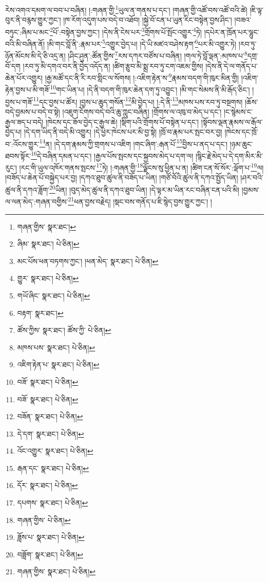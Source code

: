 རེས་འགའ་དམག་ལ་བབ་པ་བཞིན། །:གཞན་གྱི་\footnote{གཞན་གྱིས་  སྣར་ཐང་། }ཡུལ་ན་གནས་པ་དང་། །གཞན་གྱི་འཚོ་བས་འཚོ་བའི་ཚེ། །ཇི་ལྟ་བུར་ནི་བརྙས་གྱུར་ཀྱང་། །ཁ་རོག་འདུག་པས་བདེ་བ་འཐོབ། །སྐྱེ་བོ་ངན་པ་ཡུན་རིང་བསྟེན་བྱས་ཤིང་། །བཟའ་བཏུང་:ཞིམ་པ་མང་\footnote{ཞིམ་  སྣར་ཐང་།  པེ་ཅིན། }པོ་:བསྟེན་བྱས་ཀྱང་། །དེས་ནི་ངེས་པར་\footnote{མང་པོས་ཕན་བཏགས་ཀྱང་། །ཕན་མེད་  སྣར་ཐང་།  པེ་ཅིན། }གྲོགས་པོ་སྤོང་འགྱུར་\footnote{གྱུར་  སྣར་ཐང་།  པེ་ཅིན། }ཏེ། །དཔེར་ན་ཁྲོན་པར་ལྷུང་བའི་མི་བཞིན་ནོ། །མི་གང་བློ་ནི་:རྣམ་པར་\footnote{གཡོ་ཞིང་  སྣར་ཐང་།  པེ་ཅིན། }འགྱུར་བྱེད་པ། །དེ་ཡི་མཛའ་བཤེས་རྟག་\footnote{བརྟག་  སྣར་ཐང་། }པར་མི་འགྱུར་ཏེ། །རབ་ཏུ་ཉོན་མོངས་མི་དེ་ཅི་འདྲ་ན། །ཤིང་ཤུན་:ཚོན་གྱིས་\footnote{ཚོས་ཀྱིས་  སྣར་ཐང་། ཚོས་ཀྱི་  པེ་ཅིན། }རས་དཀར་བཙོས་པ་བཞིན། །གལ་ཏེ་བློ་ལྡན་:མཁས་པ་\footnote{མཁས་པས་  སྣར་ཐང་།  པེ་ཅིན། }དགྲ་བོ་དག །རབ་ཏུ་མི་དགའ་བར་ནི་བྱེད་འདོད་ན། །ཚིག་རྩུབ་མི་སྨྲ་རབ་ཏུ་ངག་འཇམ་གྱིས། །དེས་ནི་དེ་ལ་གནོད་པ་ཆེན་པོར་འགྱུར། །རྒྱ་མཚོ་དང་ནི་རི་རབ་གླིང་ལ་སོགས། །:འཇིག་རྟེན་ས་\footnote{འཇིག་རྟེན་པ་  སྣར་ཐང་།  པེ་ཅིན། }རྣམས་བདག་གི་ཁུར་མིན་གྱི། །འཇིག་རྟེན་བྱས་པ་མི་གཟོ་\footnote{བཟོ་  སྣར་ཐང་།  པེ་ཅིན། }གང་ཡིན་པ། །དེ་ནི་བདག་གི་ཁུར་ཆེན་དག་ཏུ་འབྱུང་། །མི་གང་སེམས་ནི་མི་རྒོད་ཅིང་། །བྱས་པ་གཟོ་\footnote{བཟོ་  སྣར་ཐང་།  པེ་ཅིན། }དང་བྱས་པ་ཚོར། །བྱས་པ་ཆུད་གསོན་\footnote{བཟོན་  སྣར་ཐང་།  པེ་ཅིན། }མི་བྱེད་པ། །:དེ་ནི་\footnote{དེ་དག་  སྣར་ཐང་།  པེ་ཅིན། }མཁས་པས་རབ་ཏུ་བསྔགས། །ཆོས་བདེ་བྱམས་པ་བདེ་བ་སྟེ། །འཇུག་ངོགས་བདེ་བའི་ཆུ་ཀླུང་བཞིན། །གྲོགས་ལ་འཁུ་བ་མེད་པ་དང་། །ང་སྙེམས་ང་རྒྱལ་ཟད་པ་བདེ། །ཁེངས་དང་ཟོལ་བྱེད་ང་རྒྱལ་ཆེ། །སྡིག་པའི་གྲོགས་པོ་བསྟེན་པ་དང་། །སྟོབས་ལྡན་རྣམས་ལ་རྒོལ་བྱེད་པ། །དེ་དག་ཡིད་ནི་བདེ་མི་འགྱུར། །དེ་ཕྱིར་ཁེངས་པར་མི་བྱ་སྟེ། །ཁྲོ་བ་རྣམ་པར་སྤང་བར་བྱ། །ཁེངས་དང་ཁྲོ་བ་:འོངས་གྱུར་\footnote{འོང་འགྱུར་  སྣར་ཐང་།  པེ་ཅིན། }ན། །དེ་དག་རྣམས་ཀྱི་གྲགས་པ་འཇིག །གང་ཞིག་:རྒན་པོ་\footnote{རྒན་དང་  སྣར་ཐང་།  པེ་ཅིན། }བྱིས་པ་ནད་པ་དང་། །ཉམ་ཆུང་ཐབས་སྟོར་\footnote{དོར་  སྣར་ཐང་།  པེ་ཅིན། }དེ་བཞིན་དམན་པ་དང་། །རྒྱལ་པོས་སྤངས་དང་སྐྱབས་མེད་པ་དག་ལ། །སྙིང་རྗེ་མེད་པ་དེ་དག་མིར་མི་རུང་། །རང་གི་ཡུལ་འཁོར་གནས་སྤངས་\footnote{དཔགས་  སྣར་ཐང་།  པེ་ཅིན། }ཏེ། །:གཞན་གྱི་\footnote{གཞན་གྱིས་  པེ་ཅིན། }ལྗོངས་སུ་ཕྱིན་པ་ན། །ཚིག་ངན་སོ་སོར་:ལྡོག་པ་\footnote{ཟློས་པ་  སྣར་ཐང་།  པེ་ཅིན། }ལ། །བཟོད་པ་ཆེན་པོ་བསྐྱེད་པར་བྱ། །དཀའ་ཐུབ་ཚུལ་ནི་བཟོད་པ་ཡིན། །གཙོ་བོའི་ཚུལ་ནི་དཀའ་སྤྱོད་ཡིན། །ཤར་བའི་ཚུལ་ནི་དཀའ་ཟློག་\footnote{བཟློག་  སྣར་ཐང་།  པེ་ཅིན། }ཡིན། །བུད་མེད་ཚུལ་ནི་དཀའ་ཐུབ་ཡིན། །དེ་ལྟར་མ་ཡིན་རང་བཞིན་ངན་པའི་མི། །བྱམས་ལ་ལན་མེད་:གཞན་བགྱིས་\footnote{གཞན་གྱིས་  སྣར་ཐང་།  པེ་ཅིན། }ཕན་བྱས་བརྗེད། །སྡང་བས་གནོད་པ་ཇི་སྙེད་བྱས་གྱུར་ཀྱང་། །
